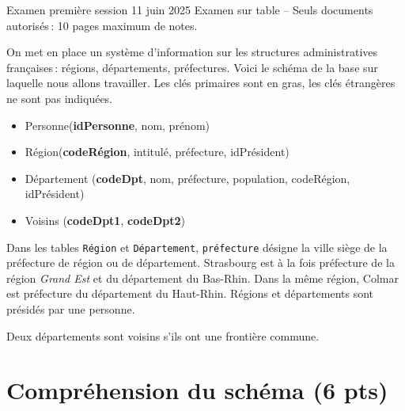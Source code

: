 %
{Examen première session 11 juin 2025}%
{Examen sur table -- Seuls documents autorisés\,: 10 pages maximum de notes.}%


On met en place un système d'information sur les structures administratives françaises\,: 
régions, départements, préfectures.
Voici le schéma de la base sur laquelle nous allons travailler. 
Les clés primaires sont en gras, les clés étrangères ne sont pas indiquées.

\begin{itemize}
\item Personne(\textbf{idPersonne}, nom, prénom)
\item Région(\textbf{codeRégion},  intitulé, préfecture, idPrésident)
\item Département (\textbf{codeDpt}, nom, préfecture, population, codeRégion, idPrésident)
\item Voisins (\textbf{codeDpt1}, \textbf{codeDpt2})
\end{itemize}

Dans les tables \texttt{Région} et  \texttt{Département}, \texttt{préfecture} désigne
la ville siège de la préfecture de région ou de département. Strasbourg
est à la fois préfecture de la région \textit{Grand Est} et du  département
du Bas-Rhin. Dans la même région, Colmar est préfecture du département du Haut-Rhin.
Régions et départements sont présidés par une personne.

Deux départements sont voisins s'ils ont une frontière commune.

\section{Compréhension du schéma (6 pts)}

